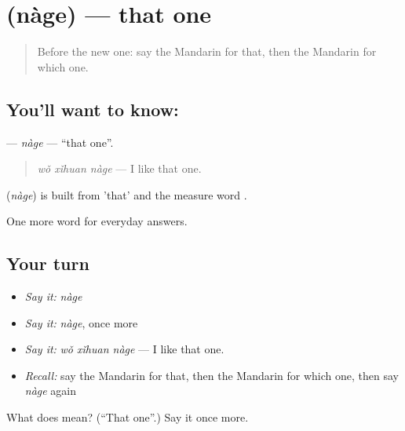 \section[\texorpdfstring{\zh{那个} (nàge)}{那个 (nàge)}]{ (nàge) — that one}

\label{lesson:ZH-C37-nage}



\begin{quote}
Before the new one: say the Mandarin for that, then the Mandarin for which one.
\end{quote}

\subsection*{You'll want to know: }
\textbf{} — \emph{nàge} — \textquotedblleft{}that one\textquotedblright{}.

\begin{quote}
\textbf{} \emph{wǒ xǐhuan nàge} — I like that one.
\end{quote}

\begin{cousinweb}
\textbf{} (\emph{nàge}) is built from  'that' and the measure word .
\end{cousinweb}

\begin{grammarlens}[title={What you've built}]
One more word for everyday answers.
\end{grammarlens}

\subsection*{Your turn}
\begin{itemize}
\raggedright
  \item \emph{Say it:} \emph{nàge}
  \item \emph{Say it:} \emph{nàge}, once more
  \item \emph{Say it:} \emph{wǒ xǐhuan nàge} — I like that one.
  \item \emph{Recall:} say the Mandarin for that, then the Mandarin for which one, then say \emph{nàge} again
\end{itemize}

\begin{tcolorbox}[breakable,colback=teal!4,colframe=teal!35!black,title={Before you move on}]
What does  mean? (\textquotedblleft{}That one\textquotedblright{}.) Say it once more.
\end{tcolorbox}
